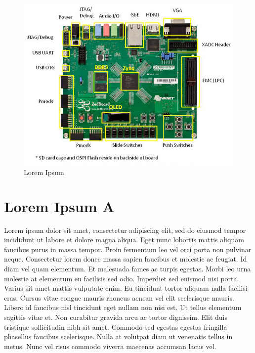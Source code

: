 \documentclass[a4paper,12pt,twoside,openright]{report}
\begin{document}
\begin{figure}[H]
  \centering
    \includegraphics[scale=0.53]{figures/example_image.jpg}
  \caption{Lorem Ipsum}
  \label{image3}
\end{figure}











\appendix
\chapter{Lorem Ipsum A \label{anexoi}}

Lorem ipsum dolor sit amet, consectetur adipiscing elit, sed do eiusmod tempor incididunt ut labore et dolore magna aliqua. Eget nunc lobortis mattis aliquam faucibus purus in massa tempor. Proin fermentum leo vel orci porta non pulvinar neque. Consectetur lorem donec massa sapien faucibus et molestie ac feugiat. Id diam vel quam elementum. Et malesuada fames ac turpis egestas. Morbi leo urna molestie at elementum eu facilisis sed odio. Imperdiet sed euismod nisi porta. Varius sit amet mattis vulputate enim. Eu tincidunt tortor aliquam nulla facilisi cras. Cursus vitae congue mauris rhoncus aenean vel elit scelerisque mauris. Libero id faucibus nisl tincidunt eget nullam non nisi est. Ut tellus elementum sagittis vitae et. Non curabitur gravida arcu ac tortor dignissim. Elit duis tristique sollicitudin nibh sit amet. Commodo sed egestas egestas fringilla phasellus faucibus scelerisque. Nulla at volutpat diam ut venenatis tellus in metus. Nunc vel risus commodo viverra maecenas accumsan lacus vel.
\end{document}
